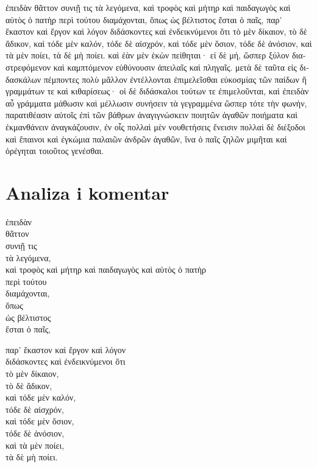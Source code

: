 {\large

\begin{greek}

\noindent ἐπειδὰν θᾶττον συνιῇ τις τὰ λεγόμενα, καὶ τροφὸς καὶ μήτηρ καὶ παιδαγωγὸς καὶ αὐτὸς ὁ πατὴρ περὶ τούτου διαμάχονται, ὅπως ὡς βέλτιστος ἔσται ὁ παῖς, παρ' ἕκαστον καὶ ἔργον καὶ λόγον διδάσκοντες καὶ ἐνδεικνύμενοι ὅτι τὸ μὲν δίκαιον, τὸ δὲ ἄδικον, καὶ τόδε μὲν καλόν, τόδε δὲ αἰσχρόν, καὶ τόδε μὲν ὅσιον, τόδε δὲ ἀνόσιον, καὶ τὰ μὲν ποίει, τὰ δὲ μὴ ποίει. καὶ ἐὰν μὲν ἑκὼν πείθηται· εἰ δὲ μή, ὥσπερ ξύλον διαστρεφόμενον καὶ καμπτόμενον εὐθύνουσιν ἀπειλαῖς καὶ πληγαῖς. μετὰ δὲ ταῦτα εἰς διδασκάλων πέμποντες πολὺ μᾶλλον ἐντέλλονται ἐπιμελεῖσθαι εὐκοσμίας τῶν παίδων ἢ γραμμάτων τε καὶ κιθαρίσεως· οἱ δὲ διδάσκαλοι τούτων τε ἐπιμελοῦνται, καὶ ἐπειδὰν αὖ γράμματα μάθωσιν καὶ μέλλωσιν συνήσειν τὰ γεγραμμένα ὥσπερ τότε τὴν φωνήν, παρατιθέασιν αὐτοῖς ἐπὶ τῶν βάθρων ἀναγιγνώσκειν ποιητῶν ἀγαθῶν ποιήματα καὶ ἐκμανθάνειν ἀναγκάζουσιν, ἐν οἷς πολλαὶ μὲν νουθετήσεις ἔνεισιν πολλαὶ δὲ διέξοδοι καὶ ἔπαινοι καὶ ἐγκώμια παλαιῶν ἀνδρῶν ἀγαθῶν, ἵνα ὁ παῖς ζηλῶν μιμῆται καὶ ὀρέγηται τοιοῦτος γενέσθαι.

\end{greek}

}


\section*{Analiza i komentar}


{\large
\begin{greek}
\noindent ἐπειδὰν \\
θᾶττον \\
συνιῇ τις \\
\tabto{2em} τὰ λεγόμενα, \\
καὶ τροφὸς καὶ μήτηρ καὶ παιδαγωγὸς καὶ αὐτὸς ὁ πατὴρ \\
\tabto{2em} περὶ τούτου \\
διαμάχονται, \\
\tabto{2em} ὅπως \\
\tabto{4em} ὡς βέλτιστος \\
\tabto{2em} ἔσται ὁ παῖς,

παρ' ἕκαστον καὶ ἔργον καὶ λόγον \\
διδάσκοντες καὶ ἐνδεικνύμενοι ὅτι \\
\tabto{2em} τὸ μὲν δίκαιον, \\
\tabto{2em} τὸ δὲ ἄδικον, \\
\tabto{2em} καὶ τόδε μὲν καλόν, \\
\tabto{2em} τόδε δὲ αἰσχρόν, \\
\tabto{2em} καὶ τόδε μὲν ὅσιον, \\
\tabto{2em} τόδε δὲ ἀνόσιον, \\
\tabto{2em} καὶ τὰ μὲν ποίει, \\
\tabto{2em} τὰ δὲ μὴ ποίει.\\

\end{greek}
}

